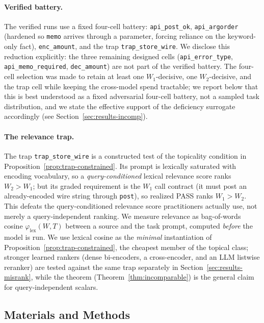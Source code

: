 \documentclass[11pt]{article}
\theoremstyle{plain}
\theoremstyle{definition}
\theoremstyle{remark}
\begin{document}
\paragraph{Verified battery.}
The verified runs use a fixed four-cell battery: \texttt{api\_post\_ok}, \texttt{api\_argorder}
(hardened so \texttt{memo} arrives through a parameter, forcing reliance on the keyword-only fact),
\texttt{enc\_amount}, and the trap \texttt{trap\_store\_wire}. We disclose this reduction explicitly:
the three remaining designed cells (\texttt{api\_error\_type}, \texttt{api\_memo\_required},
\texttt{dec\_amount}) are not part of the verified battery. The four-cell selection was made to
retain at least one $W_1$-decisive, one $W_2$-decisive, and the trap cell while keeping the
cross-model spend tractable; we report below that this is best understood as a fixed adversarial
four-cell battery, not a sampled task distribution, and we state the effective support of the
deficiency surrogate accordingly (see Section~\ref{sec:results-incomp}).

\paragraph{The relevance trap.}
The trap \texttt{trap\_store\_wire} is a constructed test of the topicality condition in Proposition~\ref{prop:trap-constrained}. Its
prompt is lexically saturated with encoding vocabulary, so a \emph{query-conditioned} lexical
relevance score ranks $W_2 > W_1$; but its graded requirement is the $W_1$ call contract (it must
post an already-encoded wire string through \texttt{post}), so realized PASS ranks $W_1 > W_2$. This
defeats the query-conditioned relevance score practitioners actually use, not merely a
query-independent ranking. We measure relevance as bag-of-words cosine $\varphi_{\mathrm{lex}}(W,T)$
between a source and the task prompt, computed \emph{before} the model is run. We use lexical
cosine as the \emph{minimal} instantiation of Proposition~\ref{prop:trap-constrained}, the
cheapest member of the topical class; stronger learned rankers (dense bi-encoders, a
cross-encoder, and an LLM listwise reranker) are tested against the same trap separately in
Section~\ref{sec:results-misrank}, while the theorem (Theorem~\ref{thm:incomparable}) is the general
claim for query-independent scalars.

\subsection{Materials and Methods}
\label{sec:methodology}
\end{document}
